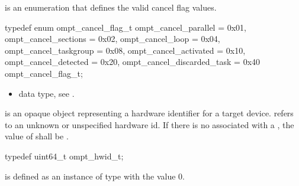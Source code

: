 
\label{sec:ompt_cancel_flag_t}
 is an enumeration that defines the valid cancel flag values.


\begin{ccppspecific}
\begin{omptEnum}
typedef enum ompt_cancel_flag_t {
  ompt_cancel_parallel       = 0x01,
  ompt_cancel_sections       = 0x02,
  ompt_cancel_loop           = 0x04,
  ompt_cancel_taskgroup      = 0x08,
  ompt_cancel_activated      = 0x10,
  ompt_cancel_detected       = 0x20,
  ompt_cancel_discarded_task = 0x40
} ompt_cancel_flag_t;
\end{omptEnum}
\end{ccppspecific}


\crossreferences
\begin{itemize}
\item {} data type, see .
\end{itemize}


\label{sec:ompt_hwid_t}
 is an opaque object representing a hardware identifier for a target device.
\label{sec:ompt_hwid_none}
 refers to an unknown or unspecified hardware id.
If there is no  associated with a
, the value of  shall be
.


\begin{ccppspecific}
\begin{omptOther}
typedef uint64_t ompt_hwid_t;
\end{omptOther}
\end{ccppspecific}

 is defined as an instance of type  with the value 
0.



